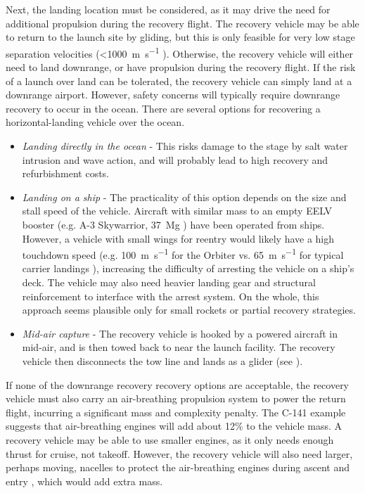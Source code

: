 \documentclass[conf]{new-aiaa}
\begin{document}
Next, the landing location must be considered, as it may drive the need for additional propulsion during the recovery flight. The recovery vehicle may be able to return to the launch site by gliding, but this is only feasible for very low stage separation velocities (<\SI{1000}{\meter\per\second} \cite{Hellman2005} \cite{Healy1998}). Otherwise, the recovery vehicle will either need to land downrange, or have propulsion during the recovery flight. If the risk of a launch over land can be tolerated, the recovery vehicle can simply land at a downrange airport. However, safety concerns will typically require downrange recovery to occur in the ocean. There are several options for recovering a horizontal-landing vehicle over the ocean.
 
 \begin{itemize}
 	\item \emph{Landing directly in the ocean} - This risks damage to the stage by salt water intrusion and wave action, and will probably lead to high recovery and refurbishment costs.
 	\item \emph{Landing on a ship} - The practicality of this option depends on the size and stall speed of the vehicle. Aircraft with similar mass to an empty EELV booster (e.g. A-3 Skywarrior, \SI{37}{\mega\gram} \cite{DouglasA3}) have been operated from ships. However, a vehicle with small wings for reentry would likely have a high touchdown speed (e.g. \SI{100}{\meter\per\second} for the Orbiter \cite{ShuttleLanding} vs. \SI{65}{\meter\per\second} for typical carrier landings \cite{Shen2013}), increasing the difficulty of arresting the vehicle on a ship's deck. The vehicle may also need heavier landing gear and structural reinforcement to interface with the arrest system. On the whole, this approach seems plausible only for small rockets or partial recovery strategies.
 	\item \emph{Mid-air capture} - The recovery vehicle is hooked by a powered aircraft in mid-air, and is then towed back to near the launch facility. The recovery vehicle then disconnects the tow line and lands as a glider (see \cite{Stappert2017}).
 \end{itemize}

If none of the downrange recovery recovery options are acceptable, the recovery vehicle must also carry an air-breathing propulsion system to power the return flight, incurring a significant mass and complexity penalty.
The C-141 example suggests that air-breathing engines will add about 12\% to the vehicle mass. A recovery vehicle may be able to use smaller engines, as it only needs enough thrust for cruise, not takeoff. However, the recovery vehicle will also need larger, perhaps moving, nacelles to protect the air-breathing engines during ascent and entry \cite{Healy1998}, which would add extra mass.
\end{document}
